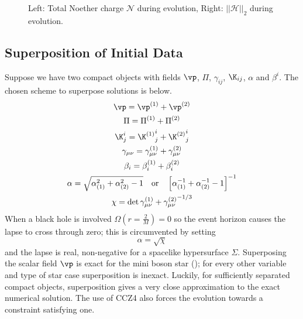   \begin{figure}[H]
  \caption{Left: Total Noether charge $\mathcal{N}$ during evolution, Right: $|| \mathcal{H} ||_2$ during evolution.}
  \centering
  \hfill
\end{figure}

\subsection{Superposition of Initial Data}
Suppose we have two compact objects with fields $\vp$, $\Pi$, $\gamma_{ij}$, $\K_{ij}$, $\alpha$ and $\beta^i$. The chosen scheme to superpose solutions is below.
\begin{gather*} \vp = \vp^{(1)} + \vp^{(2)}\\
\Pi = \Pi^{(1)} + \Pi^{(2)}\\
 \K^i_j = {\K^{(1)}}^i_j+{\K^{(2)}}^i_j\\
 \gamma_{\mu\nu} = \gamma^{(1)}_{\mu\nu} + \gamma^{(2)}_{\mu\nu}\\
\beta_i = \beta^{(1)}_i + \beta^{(2)}_i \\
 \alpha = \sqrt{\alpha_{(1)}^2 + \alpha_{(2)}^2-1} \quad \mathrm{or}\quad \left[ \alpha_{(1)}^{-1} +  \alpha_{(2)}^{-1}-1\right]^{-1}\\
 \chi = \det{\gamma^{(1)}_{\mu\nu} + \gamma^{(2)}_{\mu\nu}}^{-1/3}\end{gather*}
When a black hole is involved $\Omega(r=\frac{2}{M})=0$ so the event horizon causes the lapse to cross through zero; this is circumvented by setting
\[ \alpha = \sqrt{\chi}\]
and the lapse is real, non-negative for a spacelike hypersurface $\Sigma$. Superposing the scalar field $\vp$ is exact for the mini boson star (); for every other variable and type of star case superposition is inexact. Luckily, for sufficiently separated compact objects, superposition gives a very close approximation to the exact numerical solution. The use of CCZ4 also forces the evolution towards a constraint satisfying one. 



